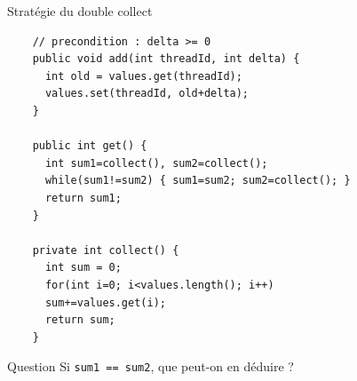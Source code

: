 
\begingroup

\begin{frame}[fragile]{Stratégie du double collect}

  \begin{lstlisting}
    // precondition : delta >= 0
    public void add(int threadId, int delta) {
      int old = values.get(threadId);
      values.set(threadId, old+delta);
    }

    public int get() {
      int sum1=collect(), sum2=collect();
      while(sum1!=sum2) { sum1=sum2; sum2=collect(); }
      return sum1;
    }

    private int collect() {
      int sum = 0;
      for(int i=0; i<values.length(); i++)
      sum+=values.get(i);
      return sum;
    }
  \end{lstlisting}
  
  \begin{exampleblock}{Question}
    Si \lstinline{sum1 == sum2}, que peut-on en déduire ?
  \end{exampleblock}
  
\end{frame}

\endgroup
\endinput
